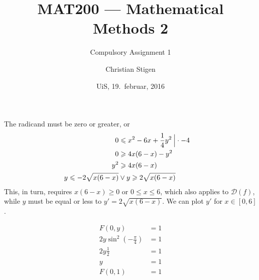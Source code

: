 \documentclass[a4paper,norsk,12pt]{article}
\title{MAT200 --- Mathematical Methods 2}
\subtitle{Compulsory Assignment 1}
\author{Christian Stigen}
\date{UiS, 19.~februar, 2016}
\begin{document}
\maketitle


The radicand must be zero or greater, or
\begin{align*}
  0 & \leqslant x^2-6x+\frac{1}{4}y^2 \> \Big{|} \cdot-4 \\
  0 & \geqslant 4x(6-x)-y^2 \\
  y^2 & \geqslant 4x(6-x) & \\
  y \leqslant -2\sqrt{x(6-x)} & \vee y \geqslant 2\sqrt{x(6-x)}
\end{align*}
This, in turn, requires $x(6-x) \geqslant 0$ or $0 \leqslant x \leqslant 6$, which also applies
to $\mathcal{D}(f)$, while $y$ must be equal or less to $y' = 2\sqrt{x(6-x)}$.
We can plot $y'$ for $x \in \left[ 0, 6 \right]$.










\begin{align*}
  F(0,y) &= 1 \\
  2y \sin^2(-\frac{\pi}{4}) &= 1 \\
  2y\frac{1}{2} &= 1 \\
  y &= 1 \\
  F(0,1) &= 1
\end{align*}
\end{document}
